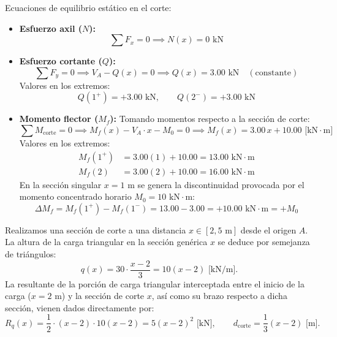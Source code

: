Ecuaciones de equilibrio estático en el corte:
\begin{itemize}
    \item \textbf{Esfuerzo axil ($N$):}
          \begin{equation}
              \sum F_x = 0 \implies \boxed{N(x) = 0\text{ kN}}
          \end{equation}

    \item \textbf{Esfuerzo cortante ($Q$):}
          \begin{equation}
              \sum F_y = 0 \implies V_A - Q(x) = 0 \implies \boxed{Q(x) = 3.00\text{ kN}} \quad (\text{constante})
          \end{equation}
          Valores en los extremos:
          \begin{equation*}
              Q(1^+) = +3.00\text{ kN}, \qquad Q(2^-) = +3.00\text{ kN}
          \end{equation*}

    \item \textbf{Momento flector ($M_f$):}
          Tomando momentos respecto a la sección de corte:
          \begin{equation}
              \sum M_{\text{corte}} = 0 \implies M_f(x) - V_A \cdot x - M_0 = 0 \implies \boxed{M_f(x) = 3.00\,x + 10.00\text{ [kN}\cdot\text{m]}}
          \end{equation}
          Valores en los extremos:
          \begin{align*}
              M_f(1^+) & = 3.00(1) + 10.00 = \boxed{13.00\text{ kN}\cdot\text{m}} \\
              M_f(2)   & = 3.00(2) + 10.00 = \boxed{16.00\text{ kN}\cdot\text{m}}
          \end{align*}
          En la sección singular $x = 1\text{ m}$ se genera la discontinuidad provocada por el momento concentrado horario $M_0 = 10\text{ kN}\cdot\text{m}$:
          \begin{equation}
              \Delta M_f = M_f(1^+) - M_f(1^-) = 13.00 - 3.00 = +10.00\text{ kN}\cdot\text{m} = +M_0
          \end{equation}
\end{itemize}


Realizamos una sección de corte a una distancia $x \in [2, 5\text{ m}]$ desde el origen $A$. La altura de la carga triangular en la sección genérica $x$ se deduce por semejanza de triángulos:
\[
    q(x) = 30 \cdot \frac{x - 2}{3} = 10(x - 2)\text{ [kN/m]}.
\]
La resultante de la porción de carga triangular interceptada entre el inicio de la carga ($x = 2\text{ m}$) y la sección de corte $x$, así como su brazo respecto a dicha sección, vienen dados directamente por:
\[
    R_{q}(x) = \frac{1}{2} \cdot (x - 2) \cdot 10(x - 2) = 5(x - 2)^2\text{ [kN]}, \qquad d_{\text{corte}} = \frac{1}{3}(x - 2)\text{ [m]}.
\]

